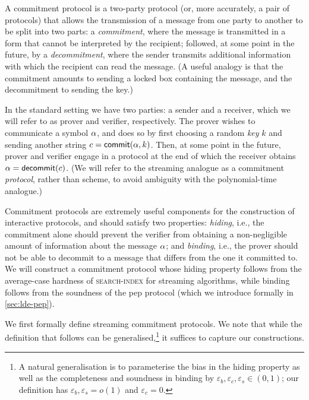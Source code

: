 \documentclass[10pt,a4paper]{article}
\theoremstyle{definition}
\newcommand{\eps}{\varepsilon}
\newcommand{\searchindex}{\normalfont\textsc{search-index}\xspace}
\newcommand{\pepprotocol}{\textsf{pep}\xspace}
\def\symbol#1{
    \ifnum#1=1
        \alpha
    \else
    \ifnum#1=2
        \beta
    \else
    \ifnum#1=3
        \gamma
    \fi\fi\fi
}
\def\fe#1{
    \ifnum#1=1
        \alpha
    \else
    \ifnum#1=2
        \beta
    \else
    \ifnum#1=3
        \gamma
    \fi\fi\fi
}
\begin{document}
A commitment protocol is a two-party protocol (or, more accurately, a pair of protocols) that allows the transmission of a message from one party to another to be split into two parts: a \emph{commitment}, where the message is transmitted in a form that cannot be interpreted by the recipient; followed, at some point in the future, by a \emph{decommitment}, where the sender transmits additional information with which the recipient can read the message. (A useful analogy is that the commitment amounts to sending a locked box containing the message, and the decommitment to sending the key.)

In the standard setting \cite{B83} we have two parties: a sender and a receiver, which we will refer to as prover and verifier, respectively. The prover wishes to communicate a symbol $\symbol1$, and does so by first choosing a random \emph{key} $k$ and sending another string $c=\textsf{commit}(\symbol1,k)$. Then, at some point in the future, prover and verifier engage in a protocol at the end of which the receiver obtains $\fe1 = \textsf{decommit}(c)$. (We will refer to the streaming analogue as a commitment \emph{protocol}, rather than scheme, to avoid ambiguity with the polynomial-time analogue.)

Commitment protocols are extremely useful components for the construction of interactive protocols, and should satisfy two properties: \emph{hiding}, i.e., the commitment alone should prevent the verifier from obtaining a non-negligible amount of information about the message $\symbol1$; and \emph{binding}, i.e., the prover should not be able to decommit to a message that differs from the one it committed to. 
We will construct a commitment protocol whose hiding property follows from the average-case hardness of \searchindex for streaming algorithms, while binding follows from the soundness of the \pepprotocol protocol (which we introduce formally in \cref{sec:lde-pep}).

We first formally define streaming commitment protocols. We note that while the definition that follows can be generalised,\footnote{A natural generalisation is to parameterise the bias in the hiding property as well as the completeness and soundness in binding by $\eps_b, \eps_c, \eps_s \in (0,1)$; our definition has $\eps_b, \eps_s = o(1)$ and $\eps_c = 0$.} it suffices to capture our constructions.
\end{document}
